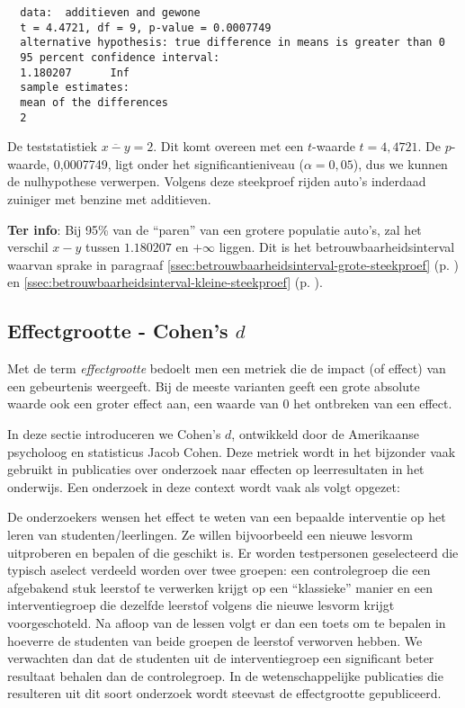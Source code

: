\begin{example}
\begin{verbatim}
  data:  additieven and gewone
  t = 4.4721, df = 9, p-value = 0.0007749
  alternative hypothesis: true difference in means is greater than 0
  95 percent confidence interval:
  1.180207      Inf
  sample estimates:
  mean of the differences 
  2 
  \end{verbatim}
  
  De teststatistiek $\overline{x-y}=2$. Dit komt overeen met een $t$-waarde $t=4,4721$.
  De $p$-waarde, 0,0007749, ligt onder het significantieniveau ($\alpha=0,05$), dus we kunnen de nulhypothese verwerpen. Volgens deze steekproef rijden auto's inderdaad zuiniger met benzine met additieven.
  
  \textbf{Ter info}: Bij 95\% van de ``paren'' van een grotere populatie auto's,
  zal het verschil $x-y$ tussen $1.180207$ en $+\infty$ liggen.
  Dit is het betrouwbaarheidsinterval waarvan sprake in paragraaf \ref{ssec:betrouwbaarheidsinterval-grote-steekproef} (p. \pageref{ssec:betrouwbaarheidsinterval-grote-steekproef})
  en \ref{ssec:betrouwbaarheidsinterval-kleine-steekproef} (p. \pageref{ssec:betrouwbaarheidsinterval-kleine-steekproef}).
\end{example}

\subsection{Effectgrootte - Cohen's \texorpdfstring{$d$}{d}}
\label{ssec:cohens-d}

Met de term \emph{effectgrootte} bedoelt men een metriek die de impact (of effect) van een gebeurtenis weergeeft. Bij de meeste varianten geeft een grote absolute waarde ook een groter effect aan, een waarde van 0 het ontbreken van een effect.

In deze sectie introduceren we Cohen's $d$, ontwikkeld door de Amerikaanse psycholoog en statisticus Jacob Cohen. Deze metriek wordt in het bijzonder vaak gebruikt in publicaties over onderzoek naar effecten op leerresultaten in het onderwijs. Een onderzoek in deze context wordt vaak als volgt opgezet:

De onderzoekers wensen het effect te weten van een bepaalde interventie op het leren van studenten/leerlingen. Ze willen bijvoorbeeld een nieuwe lesvorm uitproberen en bepalen of die geschikt is. Er worden testpersonen geselecteerd die typisch aselect verdeeld worden over twee groepen: een controlegroep die een afgebakend stuk leerstof te verwerken krijgt op een ``klassieke'' manier en een interventiegroep die dezelfde leerstof volgens die nieuwe lesvorm krijgt voorgeschoteld. Na afloop van de lessen volgt er dan een toets om te bepalen in hoeverre de studenten van beide groepen de leerstof verworven hebben. We verwachten dan dat de studenten uit de interventiegroep een significant beter resultaat behalen dan de controlegroep. In de wetenschappelijke publicaties die resulteren uit dit soort onderzoek wordt steevast de effectgrootte gepubliceerd.

